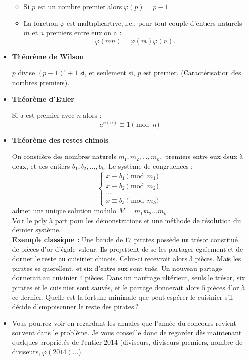 \documentclass[10pt,a4paper]{article}
\begin{document}
\begin{itemize}
\begin{itemize}
\item Si $p$ est un nombre premier alors $\varphi(p)=p-1$
\item La fonction $\varphi$ est multiplicartive, i.e., pour tout couple d'entiers naturels $m$ et $n$ premiers entre eux on a : 
$$\varphi(mn)=\varphi(m)\varphi(n).$$
\end{itemize}
\bigskip
\item \textbf{Théorème de Wilson}

$p$ divise $(p-1)!+1$ si, et seulement si, $p$ est premier. (Caractérisation des nombres premiers).
\bigskip
\item \textbf{Théorème d'Euler}

Si $a$ est premier avec $n$ alors :
$$a^{\varphi(n)} \equiv 1 \pmod n$$
\bigskip
\item \textbf{Théorème des restes chinois}

On considère des nombres naturels $m_1, m_2, ...,m_k, $ premiers entre eux deux à deux, et des entiers $b_1, b_2, ..., b_k$. Le système de congruences : 
$$\left\lbrace
\begin{array}{c}
x \equiv b_1  \pmod {m_1}\\
x \equiv b_2  \pmod {m_2} \\
... \\
x \equiv b_k \pmod {m_k}
\end{array}\right.$$
admet une unique solution modulo $M=m_1m_2...m_k$.
\\

Voir le poly à part pour les démonstrations et une méthode de résolution du dernier système.
\\

\textbf{Exemple classique : } Une bande de $17$ pirates possède un trésor constitué de pièces d'or d'égale valeur. Ils projettent de se les partager également
et de donner le reste au cuisinier chinois. Celui-ci recevrait alors $3$ pièces. Mais les pirates se querellent, et six d'entre eux sont tués. Un nouveau 
partage donnerait au cuisinier $4$ pièces. Dans un naufrage ultérieur, seuls le trésor, six pirates et le cuisinier sont sauvés, et le partage donnerait alors
$5$ pièces d'or à ce dernier. Quelle est la fortune minimale que peut espérer le cuisinier s'il décide d'empoisonner le reste des pirates\,?
\bigskip
\item Vous pourrez voir en regardant les annales que l'année du concours revient souvent dans le problème. Je vous conseille donc de regarder dès maintenant
quelques propriétés de l'entier $2014$ (diviseurs, diviseurs premiers, nombre de diviseurs, $\varphi(2014)$...).
\end{itemize}
\end{document}
